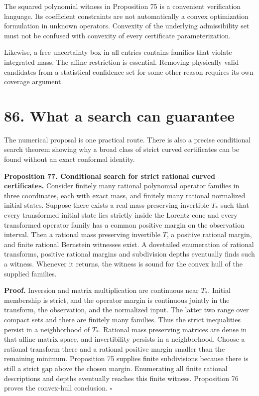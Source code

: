 \documentclass[11pt,letterpaper]{article}
\begin{document}
The squared polynomial witness in Proposition 75 is a convenient
verification language. Its coefficient constraints are not automatically
a convex optimization formulation in unknown operators. Convexity of the
underlying admissibility set must not be confused with convexity of
every certificate parameterization.

Likewise, a free uncertainty box in all entries contains families that
violate integrated mass. The affine restriction is essential. Removing
physically valid candidates from a statistical confidence set for some
other reason requires its own coverage argument.

\section{86. What a search can
guarantee}\label{what-a-search-can-guarantee}

The numerical proposal is one practical route. There is also a precise
conditional search theorem showing why a broad class of strict curved
certificates can be found without an exact conformal identity.

\textbf{Proposition 77. Conditional search for strict rational curved
certificates.} Consider finitely many rational polynomial operator
families in three coordinates, each with exact mass, and finitely many
rational normalized initial states. Suppose there exists a real mass
preserving invertible \(T_*\) such that every transformed initial state
lies strictly inside the Lorentz cone and every transformed operator
family has a common positive margin on the observation interval. Then a
rational mass preserving invertible \(T\), a positive rational margin,
and finite rational Bernstein witnesses exist. A dovetailed enumeration
of rational transforms, positive rational margins and subdivision depths
eventually finds such a witness. Whenever it returns, the witness is
sound for the convex hull of the supplied families.

\textbf{Proof.} Inversion and matrix multiplication are continuous near
\(T_*\). Initial membership is strict, and the operator margin is
continuous jointly in the transform, the observation, and the normalized
input. The latter two range over compact sets and there are finitely
many families. Thus the strict inequalities persist in a neighborhood of
\(T_*\). Rational mass preserving matrices are dense in that affine
matrix space, and invertibility persists in a neighborhood. Choose a
rational transform there and a rational positive margin smaller than the
remaining minimum. Proposition 75 supplies finite subdivisions because
there is still a strict gap above the chosen margin. Enumerating all
finite rational descriptions and depths eventually reaches this finite
witness. Proposition 76 proves the convex-hull conclusion. \(\square\)
\end{document}
